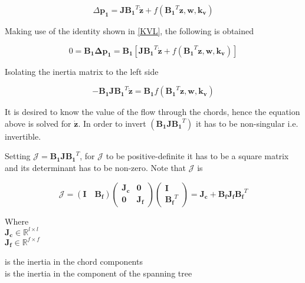 \begin{equation}
  \Delta \pmb{p_1} =  \pmb{J} {\pmb{B_1}}^T \pmb{\dot{z}} + f({\pmb{B_1}}^T \pmb{z}, \pmb{w}, \pmb{k_v})
  \label{ChordsModel}
\end{equation}

Making use of the identity shown in \eqref{KVL}, the following is obtained

\begin{equation}
  0 = \pmb{B_1} \pmb{\Delta p_1} = \pmb{B_1} [ \pmb{J {B_1}}^T \pmb{\dot{z}} + f({\pmb{B_1}}^T \pmb{z}, \pmb{w}, \pmb{k_v})] 
 \end{equation}

Isolating the inertia matrix to the left side

\begin{equation}
 - \pmb{B_1} \pmb{J} \pmb{{B_1}}^T \pmb{\dot{z}}  = \pmb{B_1} f({\pmb{B_1}}^T \pmb{z}, \pmb{w}, \pmb{k_v})
 \label{isolateZ}
 \end{equation}

It is desired to know the value of the flow through the chords, hence the equation above is solved 
for $\pmb{\dot{z}}$. In order to invert $(\pmb{B_1 J} \pmb{{B_1}}^T)$ it has to be non-singular i.e. invertible. 

Setting $\pmb{\mathcal{J}} = \pmb{B_1 J} \pmb{{B_1}}^T $, for $\pmb{\mathcal{J}}$ to be positive-definite it has to be a square matrix and its 
determinant has to be non-zero. Note that $\pmb{\mathcal{J}}$ is

\begin{equation}
  \label{Jequation}
  \pmb{\mathcal{J}} = (\pmb{I \quad B_f}) 
  \begin{pmatrix}
    \pmb{J_c}    &    \pmb{0 }   \\
    \pmb{0}       &   \pmb{ J_f}
  \end{pmatrix}
  \begin{pmatrix}
    \pmb{I}    \\
    \pmb{{B_f}}^T
  \end{pmatrix}
  = \pmb{J_c} + \pmb{B_f J_f} \pmb{{B_f}}^T
\end{equation}

\begin{minipage}[t]{0.20\textwidth}
Where\\
\hspace*{8mm} $\pmb{J_c} \in \mathbb{R}^{l \times l}$  \\
\hspace*{8mm} $\pmb{J_f} \in \mathbb{R}^{f \times f} $ 
\end{minipage}
\begin{minipage}[t]{0.68\textwidth}
\vspace*{2mm}
\hspace*{4mm} is the inertia in the chord components\\
\hspace*{4mm} is the inertia in the component of the spanning tree 
\end{minipage}

